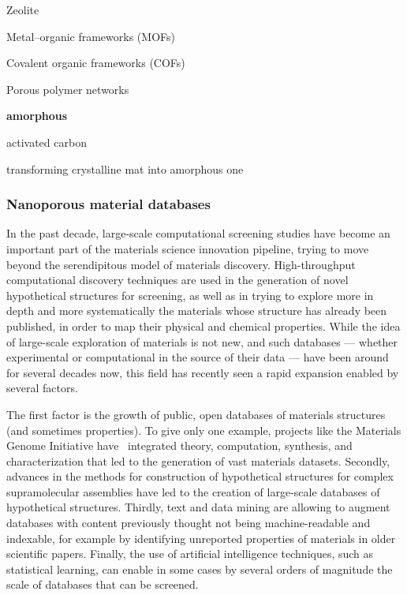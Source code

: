 \documentclass[main.tex]{subfiles}
\begin{document}
Zeolite

Metal--organic frameworks (MOFs)

Covalent organic frameworks (COFs)

Porous polymer networks

\textbf{amorphous}

activated carbon 

transforming crystalline mat into amorphous one

\subsubsection{Nanoporous material databases}


In the past decade, large-scale computational screening studies have become an important part of the materials science innovation pipeline,\cite{Hautier_2019, Cole_2020} trying to move beyond the serendipitous model of materials discovery.\cite{Ludwig_2019, Stein_2019} High-throughput computational discovery techniques are used in the generation of novel hypothetical structures for screening,\cite{Wilmer_2012, Boyd_2016} as well as in trying to explore more in depth and more systematically the materials whose structure has already been published, in order to map their physical and chemical properties.\cite{GomezGualdron_2014,Moliner_2019,SalcedoPerez_2019} While the idea of large-scale exploration of materials is not new, and such databases --- whether experimental or computational in the source of their data --- have been around for several decades now,\cite{PDB_1971, Grazulis_2009, Groom_2016} this field has recently seen a rapid expansion enabled by several factors. 

The first factor is the growth of public, open databases of materials structures (and sometimes properties).\cite{Coudert_2019} To give only one example, projects like the Materials Genome Initiative have~\cite{dePablo_2014, dePablo_2019} integrated theory, computation, synthesis, and characterization that led to the generation of vast materials datasets.\cite{Jain_2013, Jain_2016} Secondly, advances in the methods for construction of hypothetical structures for complex supramolecular assemblies have led to the creation of large-scale databases of hypothetical structures.\cite{Foster_2004, Wilmer_2013,Boyd_2016} Thirdly, text and data mining are allowing to augment databases with content previously thought not being machine-readable and indexable, for example by identifying unreported properties of materials in older scientific papers.\cite{Tshitoyan_2019, Court_2020} Finally, the use of artificial intelligence techniques, such as statistical learning,\cite{Butler_2018} can enable in some cases by several orders of magnitude the scale of databases that can be screened.\cite{Kim_2017, Borboudakis_2017, Chibani_2020}
\end{document}
